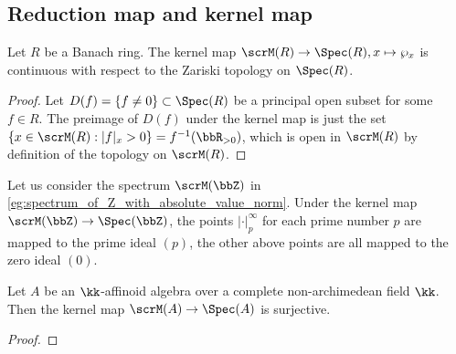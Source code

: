     


\subsection{Reduction map and kernel map}

    \begin{proposition}\label{prop:kernel_map_from_M_R_to_Spec_R}
        Let \(R\) be a Banach ring.
        The kernel map \(\scrM(R) \to \Spec(R), x \mapsto \wp_x\) is continuous with respect to the Zariski topology on \(\Spec(R)\).
    \end{proposition}
    \begin{proof}
        Let \(D(f) = \{f\neq 0\} \subset \Spec(R)\) be a principal open subset for some \(f \in R\).
        The preimage of \(D(f)\) under the kernel map is just the set \(\{x \in \scrM(R) : |f|_x > 0\} = f^{-1}(\bbR_{>0})\), 
        which is open in \(\scrM(R)\) by definition of the topology on \(\scrM(R)\).
    \end{proof}


    \begin{example}\label{eg:M_Z_under_the_kernel_map}
        Let us consider the spectrum \(\scrM(\bbZ)\) in \cref{eg:spectrum_of_Z_with_absolute_value_norm}.
        Under the kernel map \(\scrM(\bbZ) \to \Spec(\bbZ)\), the points \(|\cdot|_p^\infty\) for each prime number \(p\) are mapped to the prime ideal \((p)\), 
        the other above points are all mapped to the zero ideal \((0)\). 
    \end{example}



    \begin{proposition}\label{prop:kernel_map_of_affinoid_algebras}
        Let \(A\) be an \(\kk\)-affinoid algebra over a complete non-archimedean field \(\kk\).
        Then the kernel map \(\scrM(A) \to \Spec(A)\) is surjective.
    \end{proposition}
    \begin{proof}
    \end{proof}


